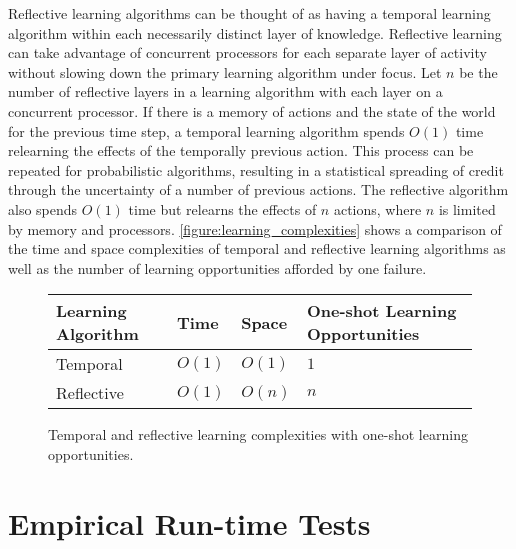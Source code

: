 Reflective learning algorithms can be thought of as having a temporal
learning algorithm within each necessarily distinct layer of
knowledge.  Reflective learning can take advantage of concurrent
processors for each separate layer of activity without slowing down
the primary learning algorithm under focus.  Let $n$ be the number of
reflective layers in a learning algorithm with each layer on a
concurrent processor.  If there is a memory of actions and the state
of the world for the previous time step, a temporal learning algorithm
spends $O(1)$ time relearning the effects of the temporally previous
action.  This process can be repeated for probabilistic algorithms,
resulting in a statistical spreading of credit through the uncertainty
of a number of previous actions.  The reflective algorithm also spends
$O(1)$ time but relearns the effects of $n$ actions, where $n$ is
limited by memory and processors.
{\mbox{\autoref{figure:learning_complexities}}} shows a comparison of
the time and space complexities of temporal and reflective learning
algorithms as well as the number of learning opportunities afforded by
one failure.
\begin{figure}
\center
\begin{tabular}{p{2cm}|p{2cm}|p{2cm}|p{3cm}}
Learning Algorithm & Time   & Space  & One-shot Learning Opportunities \\ \hline
Temporal           & $O(1)$ & $O(1)$ & $1$ \\
Reflective         & $O(1)$ & $O(n)$ & $n$ \\
\end{tabular}
\caption{Temporal and reflective learning complexities with one-shot learning opportunities.}
\label{figure:learning_complexities}
\end{figure}

\section{Empirical Run-time Tests}


